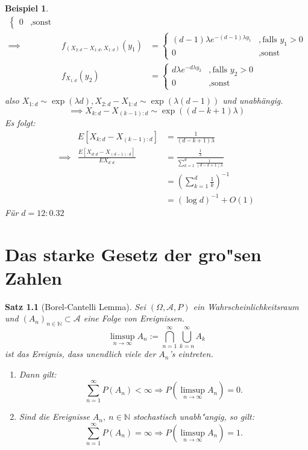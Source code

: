 \documentclass[a4paper,11pt]{book}
\newcommand{\N}{{\mathbb N}}
\def\AA{ \mathcal{A} }
\def\folgt{\ensuremath{\implies}}
\newtheorem{Sa}{Satz}[chapter]
\newtheorem{Bsp}{Beispiel}[chapter]
\theoremstyle{nonumberplain}
\begin{document}
\begin{Bsp}
\begin{eqnarray*}
\begin{cases}
0&,\text{sonst}
\end{cases}\\
\folgt&f_{(X_{2:d}-X_{1:d},X_{1:d})}(y_1)&=\begin{cases}
(d-1)\lambda e^{-(d-1)\lambda y_1} &,\text{falls } y_1>0\\
0&,\text{sonst}
\end{cases}\\
&f_{X_{1:d}}(y_2)&=\begin{cases}
d\lambda e^{-d\lambda y_2} &,\text{falls } y_2>0\\
0&,\text{sonst}
\end{cases}\\
\end{eqnarray*}
also $X_{1:d}\sim\exp(\lambda d), X_{2:d}-X_{1:d}\sim\exp(\lambda(d-1))$ und unabhängig.
$$\folgt X_{k:d}-X_{(k-1):d}\sim\exp((d-k+1)\lambda)$$
Es folgt:
\begin{eqnarray*}
&E[X_{k:d}-X_{(k-1):d}]&=\frac{1}{(d-k+1)\lambda}\\
\folgt & \frac{E[X_{d:d}-X_{(d-1):d}]}{EX_{d:d}} &=\frac{\frac 1 \lambda}{\sum_{k=1}^d\frac{1}{(d-k+1)\lambda}}\\
& &=\left(\sum_{k=1}^d\frac 1 k\right)^{-1}\\
& &=(\log d)^{-1}+O(1)
\end{eqnarray*}
Für $d=12: 0.32$
\end{Bsp}


\chapter{Das starke Gesetz der gro"sen Zahlen}

\begin{Sa}[Borel-Cantelli Lemma] \label{Sa4.1}
Sei $(\Omega,\AA,P)$ ein Wahrscheinlichkeitsraum und $(A_n)_{n \in \N} \subset \AA$ eine Folge von Ereignissen.
\[
\limsup_{n \rightarrow \infty} A_n := \bigcap_{n=1}^{\infty} \bigcup_{k=n}^{\infty} A_k
\]
ist das Ereignis, dass unendlich viele der $A_n$'s eintreten.
\begin{enumerate}
\item[a)] Dann gilt: 
\[
\sum_{n=1}^{\infty} P(A_n) < \infty \Longrightarrow P(\limsup_{n \rightarrow \infty} A_n) = 0.
\]

\item[b)] Sind die Ereignisse $A_n,\ n \in \N$ stochastisch unabh"angig, so gilt:
\[
\sum_{n=1}^{\infty} P(A_n) = \infty \Longrightarrow P(\limsup_{n \rightarrow \infty}A_n) = 1.
\]
\end{enumerate}
\end{Sa}
\end{document}
